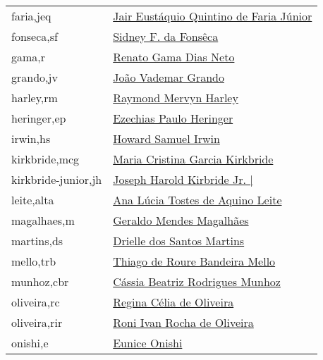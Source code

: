 \begin{longtable}{l l}
faria,jeq           & \hyperlink{http://lattes.cnpq.br/3214384669945455}{Jair Eustáquio Quintino de Faria Júnior} \\
fonseca,sf          & \hyperlink{https://plants.jstor.org/stable/10.5555/al.ap.person.bm000117349}{Sidney F. da Fonsêca} \\
gama,r              & \hyperlink{http://lattes.cnpq.br/7699197078019809}{Renato Gama Dias Neto} \\
grando,jv           & \hyperlink{http://lattes.cnpq.br/6229685164094420}{João Vademar Grando} \\
harley,rm           & \hyperlink{https://plants.jstor.org/stable/10.5555/al.ap.person.bm000003418}{Raymond Mervyn Harley} \\
heringer,ep         & \hyperlink{https://plants.jstor.org/stable/10.5555/al.ap.person.bm000003587}{Ezechias Paulo Heringer} \\
irwin,hs            & \hyperlink{https://plants.jstor.org/stable/10.5555/al.ap.person.bm000003953}{Howard Samuel Irwin} \\
kirkbride,mcg       & \hyperlink{-}{Maria Cristina Garcia Kirkbride} \\
kirkbride-junior,jh & \hyperlink{https://plants.jstor.org/stable/10.5555/al.ap.person.bm000011449}{Joseph Harold Kirbride Jr.                        |} \\
leite,alta          & \hyperlink{http://lattes.cnpq.br/7719191749294093 }{Ana Lúcia Tostes de Aquino Leite} \\
magalhaes,m         & \hyperlink{https://plants.jstor.org/stable/10.5555/al.ap.person.bm000005315}{Geraldo Mendes Magalhães} \\
martins,ds          & \hyperlink{http://lattes.cnpq.br/5209656812635059}{Drielle dos Santos Martins} \\
mello,trb           & \hyperlink{http://lattes.cnpq.br/0930415350491316 }{Thiago de Roure Bandeira Mello} \\
munhoz,cbr          & \hyperlink{http://lattes.cnpq.br/9973242126324510}{Cássia Beatriz Rodrigues Munhoz} \\
oliveira,rc         & \hyperlink{http://lattes.cnpq.br/2968817136128886}{Regina Célia de Oliveira} \\
oliveira,rir        & \hyperlink{http://lattes.cnpq.br/7006488728244815}{Roni Ivan Rocha de Oliveira} \\
onishi,e            & \hyperlink{https://plants.jstor.org/stable/10.5555/al.ap.person.bm000053001}{Eunice Onishi} \\

\end{longtable}
